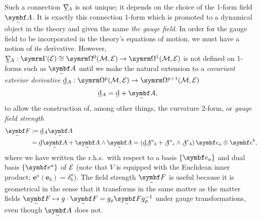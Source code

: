 Such a connection $\ts\nabla_{\!A}$ is not unique; it depends on the choice of the 1-form field $\tsbm A$.
It is exactly this connection 1-form which is promoted to a dynamical object in the theory and given the name \emph{the gauge field}.
In order for the gauge field to be incorporated in the theory's equations of motion, we must have a notion of its derivative.
However, $\ts\nabla_{\!A} : \secs(\cal E) \cong \forms^0(\cal M, \cal E) \to \forms^1(\cal M, \cal E)$ is not defined on 1-forms such as $\tsbm A$ until we make the natural extension\footnotemark{} to a \emph{covariant exterior derivative}
$\ts\dd_A : \forms^p(\cal M, \cal E) \to \forms^{p + 1}(\cal M, \cal E)$
\begin{align}
	\ts\dd_A &= \ts\dd + \tsbm A
,\end{align}
%
to allow the construction of, among other things, the curvature 2-form, or \emph{gauge field strength}
\begin{align}
	\tsbm F &\coloneq \ts\dd_A\tsbm A
\\	&= \ts\dd\tsbm A + \tsbm A \wedge \tsbm A
	= (\ts\dd\ts A^a{}_b + \ts A^a{}_c \wedge \ts A^c{}_b) \, \bm e_a \otimes \bm e^b
,\end{align}
where we have written the r.h.s.\ with respect to a basis $\qty{\bm e_a}$ and dual basis $\qty{\bm e^a}$ of $\cal E$ (note that $V$ is equipped with the Euclidean inner product; $\bm e^a (\bm e_b) = \delta^a_b$).
The field strength $\tsbm F$ is useful because it is geometrical in the sense that it transforms in the same matter as the matter fields $\tsbm F \mapsto g\cdot\tsbm F = g_\rho\tsbm F g_\rho^{-1}$ under gauge transformations, even though $\tsbm A$ does not.

